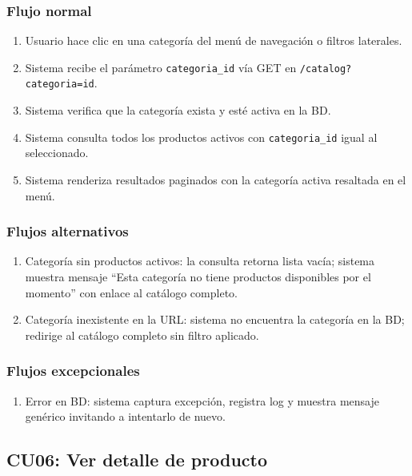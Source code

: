 \documentclass[12pt,a4paper]{article}
\begin{document}
\subsubsection*{Flujo normal}
\begin{enumerate}[label=FN-\arabic*]
    \item Usuario hace clic en una categoría del menú de navegación o filtros laterales.
    \item Sistema recibe el parámetro \texttt{categoria\_id} vía GET en \texttt{/catalog?categoria=id}.
    \item Sistema verifica que la categoría exista y esté activa en la BD.
    \item Sistema consulta todos los productos activos con \texttt{categoria\_id} igual al seleccionado.
    \item Sistema renderiza resultados paginados con la categoría activa resaltada en el menú.
\end{enumerate}

\subsubsection*{Flujos alternativos}
\begin{enumerate}[label=FA-\arabic*]
    \item Categoría sin productos activos: la consulta retorna lista vacía; sistema muestra mensaje “Esta categoría no tiene productos disponibles por el momento” con enlace al catálogo completo.
    \item Categoría inexistente en la URL: sistema no encuentra la categoría en la BD; redirige al catálogo completo sin filtro aplicado.
\end{enumerate}

\subsubsection*{Flujos excepcionales}
\begin{enumerate}[label=FE-\arabic*]
    \item Error en BD: sistema captura excepción, registra log y muestra mensaje genérico invitando a intentarlo de nuevo.
\end{enumerate}


\subsection{CU06: Ver detalle de producto}
\end{document}
